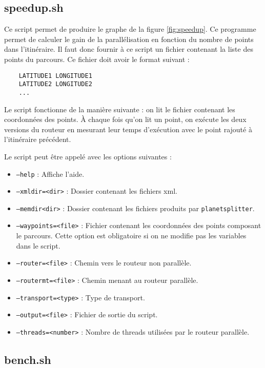 \begin{appendices}
  \subsection{speedup.sh}
  \label{ann:speedup}

  Ce script permet de produire le graphe de la figure \ref{fig:speedup}. 
  Ce programme permet de calculer le gain de la parallélisation en fonction
  du nombre de points dans l'itinéraire. Il faut donc fournir à ce script un 
  fichier contenant la liste des points du parcours. Ce fichier doit avoir le 
  format suivant :
  \begin{lstlisting}
    LATITUDE1 LONGITUDE1
    LATITUDE2 LONGITUDE2
    ...
  \end{lstlisting}
  \vspace{1em}

  Le script fonctionne de la manière suivante : on lit le fichier contenant les 
  coordonnées des points. \`A chaque fois qu'on lit un point, on exécute les deux 
  versions du routeur en mesurant leur temps d'exécution avec le point rajouté 
  à l'itinéraire précédent. 

  Le script peut être appelé avec les options suivantes : 
  \begin{itemize}
    \renewcommand{\labelitemi}{$\bullet$}
  \item \texttt{--help} : Affiche l'aide.
  \item \texttt{--xmldir=<dir>} : Dossier contenant les fichiers xml.
  \item \texttt{--memdir<dir>} : Dossier contenant les fichiers produits
    par \texttt{planetsplitter}.
  \item \texttt{--waypoints=<file>} : Fichier contenant les coordonnées des 
    points composant le parcours. Cette option est obligatoire si on ne 
    modifie pas les variables dans le script.
  \item \texttt{--router=<file>} : Chemin vers le routeur non parallèle.
  \item \texttt{--routermt=<file>} : Chemin menant au routeur parallèle.
  \item \texttt{--transport=<type>} : Type de transport.
  \item \texttt{--output=<file>} : Fichier de sortie du script.
  \item \texttt{--threads=<number>} : Nombre de threads utilisées par le routeur
    parallèle.
  \end{itemize}

  \subsection{bench.sh}


\end{appendices}
